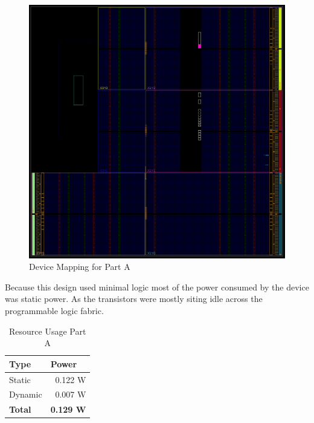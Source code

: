\documentclass[letterpaper, 10 pt, conference]{IEEEconf}  %
\begin{document}
\begin{figure}[thpb]
   \centering
   \parbox{3in}{\centering\includegraphics[scale=0.35]{img/mp1a_device.PNG}}
   \caption{Device Mapping for Part A}
   \label{figurelabel}
\end{figure}

Because this design used minimal logic most of the power consumed by the device was static power. As the transistors were mostly siting idle across the programmable logic fabric.
\begin{table}[]
\centering
\caption{Resource Usage Part A}
\label{table_example}
\begin{tabular}{|l|r|}
\hline
\rowcolor[HTML]{EFEFEF} 
Type    & \multicolumn{1}{l|}{\cellcolor[HTML]{EFEFEF}Power} \\ \hline
Static  & 0.122 W                                            \\ \hline
Dynamic & 0.007 W                                            \\ \hline
\textbf{Total} & \textbf{0.129 W}                            \\ \hline
\end{tabular}
\end{table}
\end{document}
